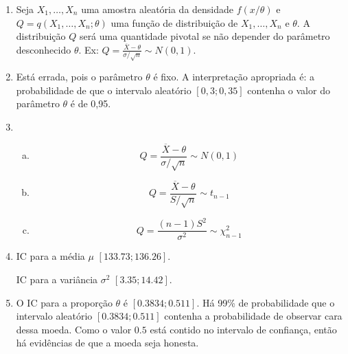 \documentclass[10pt,brazil,addpoints]{exam}
\begin{document}
\begin{enumerate}[1.]

\item Seja $X_1, \ldots, X_n$ uma amostra aleatória da densidade $f(x/\theta)$ e $Q=q(X_1, \ldots, X_n; \theta)$ uma função de distribuição de $X_1, \ldots, X_n$ e $\theta$. A distribuição $Q$ será uma quantidade pivotal se não depender do parâmetro desconhecido $\theta$. Ex: $Q=\frac{\overline{X}-\theta}{\sigma/\sqrt{n}}\sim N(0,1)$.

\item Está errada, pois o parâmetro $\theta$ é fixo. A interpretação apropriada é: a probabilidade de que o intervalo aleatório $[0,3 ; 0,35]$ contenha o valor do parâmetro $\theta$ é de 0,95.

\item 
\begin{enumerate}[a)]
\item 

\begin{equation}
Q= \frac{\overline{X}-\theta} {\sigma/\sqrt{n}} \sim N(0,1)
\end{equation}

\item 

\begin{equation}
Q= \frac{\overline{X}-\theta} {S/\sqrt{n}} \sim t_{n-1}
\end{equation}

\item 

\begin{equation}
Q= \frac{(n-1)S^2}{\sigma^2} \sim \chi^2_{n-1}
\end{equation}

\end{enumerate}

\item IC para a média $\mu$ $[133.73 ; 136.26]$.

IC para a variância $\sigma^2$ $[3.35 ; 14.42]$.

\item O IC para a proporção $\theta$ é $[0.3834; 0.511]$. Há 99\% de probabilidade que o intervalo aleatório $[0.3834; 0.511]$ contenha a probabilidade de observar cara dessa moeda. Como o valor $0.5$ está contido no intervalo de confiança, então há evidências de que a moeda seja honesta.



\end{enumerate}
\end{document}
